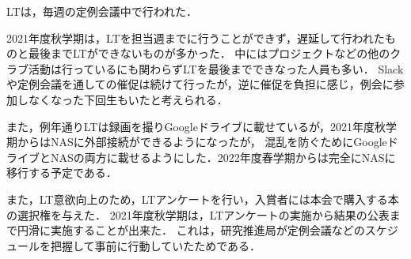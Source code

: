 LTは，毎週の定例会議中で行われた．

2021年度秋学期は，LTを担当週までに行うことができず，遅延して行われたものと最後までLTができないものが多かった．
中にはプロジェクトなどの他のクラブ活動は行っているにも関わらずLTを最後までできなった人員も多い．
Slackや定例会議を通しての催促は続けて行ったが，逆に催促を負担に感じ，例会に参加しなくなった下回生もいたと考えられる．

また，例年通りLTは録画を撮りGoogleドライブに載せているが，2021年度秋学期からはNASに外部接続ができるようになったが，
混乱を防ぐためにGoogleドライブとNASの両方に載せるようにした．2022年度春学期からは完全にNASに移行する予定である．

また，LT意欲向上のため，LTアンケートを行い，入賞者には本会で購入する本の選択権を与えた．
2021年度秋学期は，LTアンケートの実施から結果の公表まで円滑に実施することが出来た．
これは，研究推進局が定例会議などのスケジュールを把握して事前に行動していたためである．

